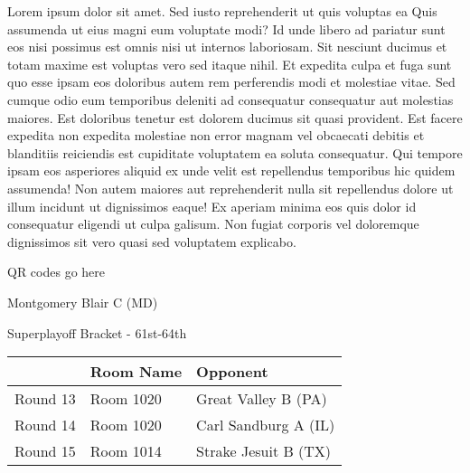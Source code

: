 \documentclass{article}%
\begin{document}
\vspace*{8pt}%
\linebreak%
\newline%
\newline%
Lorem ipsum dolor sit amet. Sed iusto reprehenderit ut quis voluptas ea Quis assumenda ut eius magni eum voluptate modi? Id unde libero ad pariatur sunt eos nisi possimus est omnis nisi ut internos laboriosam. Sit nesciunt ducimus et totam maxime est voluptas vero sed itaque nihil. Et expedita culpa et fuga sunt quo esse ipsam eos doloribus autem rem perferendis modi et molestiae vitae.\newline%
\newline%
Sed cumque odio eum temporibus deleniti ad consequatur consequatur aut molestias maiores. Est doloribus tenetur est dolorem ducimus sit quasi provident. Est facere expedita non expedita molestiae non error magnam vel obcaecati debitis et blanditiis reiciendis est cupiditate voluptatem ea soluta consequatur. Qui tempore ipsam eos asperiores aliquid ex unde velit est repellendus temporibus hic quidem assumenda!\newline%
\newline%
Non autem maiores aut reprehenderit nulla sit repellendus dolore ut illum incidunt ut dignissimos eaque! Ex aperiam minima eos quis dolor id consequatur eligendi ut culpa galisum. Non fugiat corporis vel doloremque dignissimos sit vero quasi sed voluptatem explicabo.\newline%
\newline%
%
\vspace*{30pt}%
\begin{center}%
\begin{Huge}%
QR codes go here%
\end{Huge}%
\end{center}%
\newpage%
\begin{center}%
\begin{Huge}%
Montgomery Blair C (MD)%
\end{Huge}%
\vspace*{8pt}%
\linebreak%
\begin{Large}%
Superplayoff Bracket {-} 61st{-}64th%
\end{Large}%
\end{center}%
%
\begin{tabularx}{\textwidth}{|c|Y|Y|}%
\hline%
&Room Name&Opponent\\%
\hline%
Round 13&Room 1020&Great Valley B (PA)\\%
Round 14&Room 1020&Carl Sandburg A (IL)\\%
Round 15&Room 1014&Strake Jesuit B (TX)\\%
\hline%
\end{tabularx}%
\end{document}
